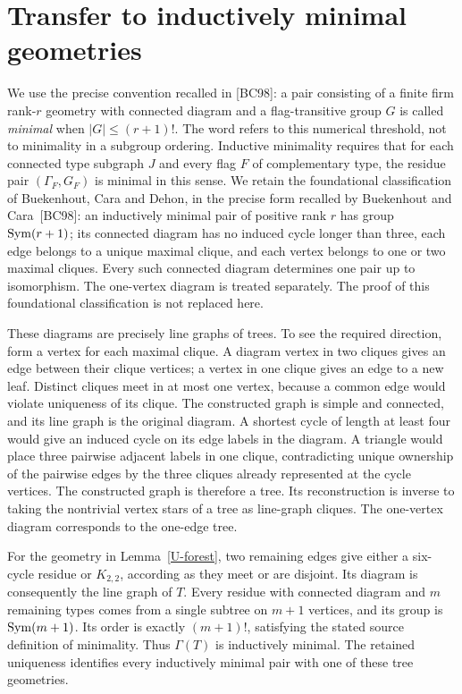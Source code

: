 \section{Transfer to inductively minimal geometries}
We use the precise convention recalled in [BC98]: a pair consisting of
a finite firm rank-$r$ geometry with connected diagram and a
flag-transitive group $G$ is called \emph{minimal} when
$|G|\leq(r+1)!$. The word refers to this numerical threshold, not to
minimality in a subgroup ordering. Inductive minimality requires that
for each connected type subgraph $J$ and every flag $F$ of complementary
type, the residue pair $(\Gamma_F,G_F)$ is minimal in this sense.
We retain the foundational classification of Buekenhout, Cara and Dehon,
in the precise form recalled by Buekenhout and Cara~[BC98]: an inductively
minimal pair of positive rank $r$ has group $\operatorname{Sym}(r+1)$; its connected
diagram has no induced cycle longer than three, each edge belongs to a
unique maximal clique, and each vertex belongs to one or two maximal
cliques. Every such connected diagram determines one pair up to
isomorphism. The one-vertex diagram is treated separately. The proof of
this foundational classification is not replaced here.

These diagrams are precisely line graphs of trees. To see the required
direction, form a vertex for each maximal clique. A diagram vertex in
two cliques gives an edge between their clique vertices; a vertex in
one clique gives an edge to a new leaf. Distinct cliques meet in at most
one vertex, because a common edge would violate uniqueness of its
clique. The constructed graph is simple and connected, and its line
graph is the original diagram. A shortest cycle of length at least four
would give an induced cycle on its edge labels in the diagram. A triangle
would place three pairwise adjacent labels in one clique, contradicting
unique ownership of the pairwise edges by the three cliques already
represented at the cycle vertices. The constructed graph is therefore
a tree. Its reconstruction is inverse to taking the nontrivial vertex
stars of a tree as line-graph cliques. The one-vertex diagram corresponds
to the one-edge tree.

For the geometry in Lemma~\ref{U-forest}, two remaining edges give either
a six-cycle residue or $K_{2,2}$, according as they meet or are disjoint.
Its diagram is consequently the line graph of $T$. Every residue with
connected diagram and $m$ remaining types comes from a single subtree
on $m+1$ vertices, and its group is $\operatorname{Sym}(m+1)$. Its order is exactly
$(m+1)!$, satisfying the stated source definition of minimality.
Thus $\Gamma(T)$ is inductively minimal.
The retained uniqueness identifies every inductively minimal pair with
one of these tree geometries.

